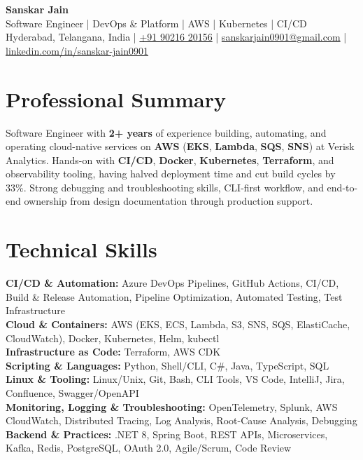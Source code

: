 \documentclass[a4paper,10pt]{article}
\begin{document}
\begin{center}
    {\LARGE \textbf{Sanskar Jain}} \\
    \vspace{2pt}
    Software Engineer \;|\; DevOps \& Platform \;|\; AWS \;|\; Kubernetes \;|\; CI/CD \\
    \vspace{2pt}
    Hyderabad, Telangana, India \;|\;
    \href{tel:+919021620156}{+91 90216 20156} \;|\;
    \href{mailto:sanskarjain0901@gmail.com}{sanskarjain0901@gmail.com} \;|\;
    \href{https://www.linkedin.com/in/sanskar-jain0901/}{linkedin.com/in/sanskar-jain0901}
\end{center}

\section*{Professional Summary}
Software Engineer with \textbf{2+ years} of experience building, automating, and operating cloud-native services on \textbf{AWS} (\textbf{EKS}, \textbf{Lambda}, \textbf{SQS}, \textbf{SNS}) at Verisk Analytics.
Hands-on with \textbf{CI/CD}, \textbf{Docker}, \textbf{Kubernetes}, \textbf{Terraform}, and observability tooling, having halved deployment time and cut build cycles by 33\%.
Strong debugging and troubleshooting skills, CLI-first workflow, and end-to-end ownership from design documentation through production support.

\section*{Technical Skills}
\begin{sloppypar}
\noindent
\textbf{CI/CD \& Automation:} Azure DevOps Pipelines, GitHub Actions, CI/CD, Build \& Release Automation, Pipeline Optimization, Automated Testing, Test Infrastructure \\
\textbf{Cloud \& Containers:} AWS (EKS, ECS, Lambda, S3, SNS, SQS, ElastiCache, CloudWatch), Docker, Kubernetes, Helm, kubectl \\
\textbf{Infrastructure as Code:} Terraform, AWS CDK \\
\textbf{Scripting \& Languages:} Python, Shell/CLI, C\#, Java, TypeScript, SQL \\
\textbf{Linux \& Tooling:} Linux/Unix, Git, Bash, CLI Tools, VS Code, IntelliJ, Jira, Confluence, Swagger/OpenAPI \\
\textbf{Monitoring, Logging \& Troubleshooting:} OpenTelemetry, Splunk, AWS CloudWatch, Distributed Tracing, Log Analysis, Root-Cause Analysis, Debugging \\
\textbf{Backend \& Practices:} .NET 8, Spring Boot, REST APIs, Microservices, Kafka, Redis, PostgreSQL, OAuth 2.0, Agile/Scrum, Code Review
\end{sloppypar}
\end{document}
